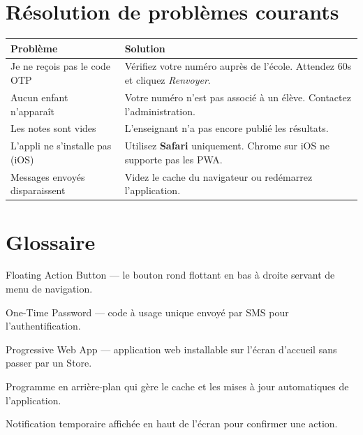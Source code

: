 \section{R\'esolution de probl\`emes courants}

\begin{center}
\begin{tabularx}{\textwidth}{lX}
\toprule
\textbf{Probl\`eme} & \textbf{Solution} \\
\midrule
Je ne re\c{c}ois pas le code OTP & V\'erifiez votre num\'ero aupr\`es de l'\'ecole. Attendez 60s et cliquez \textit{Renvoyer}. \\
Aucun enfant n'appara\^it & Votre num\'ero n'est pas associ\'e \`a un \'el\`eve. Contactez l'administration. \\
Les notes sont vides & L'enseignant n'a pas encore publi\'e les r\'esultats. \\
L'appli ne s'installe pas (iOS) & Utilisez \textbf{Safari} uniquement. Chrome sur iOS ne supporte pas les PWA. \\
Messages envoy\'es disparaissent & Videz le cache du navigateur ou red\'emarrez l'application. \\
\bottomrule
\end{tabularx}
\end{center}

\section{Glossaire}

\begin{description}[leftmargin=1.5cm, style=nextline, font=\bfseries\color{indigo}]
  \item[FAB] Floating Action Button --- le bouton rond flottant en bas \`a droite servant de menu de navigation.
  \item[OTP] One-Time Password --- code \`a usage unique envoy\'e par SMS pour l'authentification.
  \item[PWA] Progressive Web App --- application web installable sur l'\'ecran d'accueil sans passer par un Store.
  \item[Service Worker] Programme en arri\`ere-plan qui g\`ere le cache et les mises \`a jour automatiques de l'application.
  \item[Toast] Notification temporaire affich\'ee en haut de l'\'ecran pour confirmer une action.
\end{description}

\vspace{2cm}
\begin{center}
\end{center}
